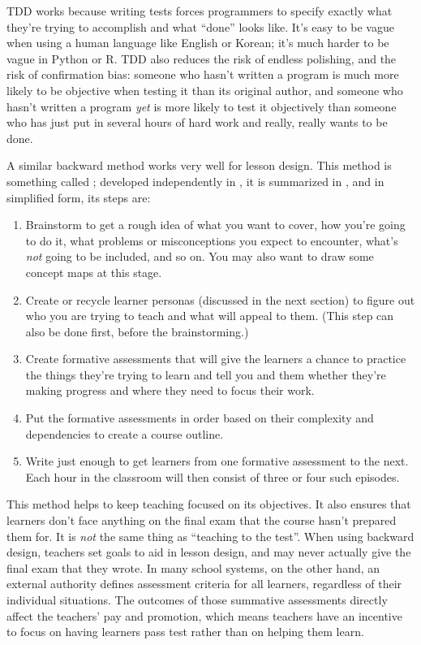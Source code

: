 TDD works because writing tests forces programmers to specify exactly
what they're trying to accomplish and what ``done'' looks like. It's
easy to be vague when using a human language like English or Korean;
it's much harder to be vague in Python or R.  TDD also reduces the
risk of endless polishing, and the risk of confirmation bias: someone
who hasn't written a program is much more likely to be objective when
testing it than its original author, and someone who hasn't written a
program \emph{yet} is more likely to test it objectively than someone
who has just put in several hours of hard work and really, really
wants to be done.

A similar backward method works very well for lesson design. This
method is something called ; developed independently in
\cite{Wigg2005,Bigg2011,Fink2013}, it is summarized in
\cite{McTi2013}, and in simplified form, its steps are:

\begin{enumerate}

\item
  Brainstorm to get a rough idea of what you want to cover, how you're
  going to do it, what problems or misconceptions you expect to
  encounter, what's \emph{not} going to be included, and so on. You
  may also want to draw some concept maps at this stage.

\item
  Create or recycle learner personas (discussed in the next section)
  to figure out who you are trying to teach and what will appeal to
  them.  (This step can also be done first, before the brainstorming.)

\item
  Create formative assessments that will give the learners a chance to
  practice the things they're trying to learn and tell you and them
  whether they're making progress and where they need to focus their
  work.

\item
  Put the formative assessments in order based on their complexity and
  dependencies to create a course outline.

\item
  Write just enough to get learners from one formative assessment to
  the next. Each hour in the classroom will then consist of three or
  four such episodes.

\end{enumerate}

This method helps to keep teaching focused on its objectives. It also
ensures that learners don't face anything on the final exam that the
course hasn't prepared them for.  It is \emph{not} the same thing as
``teaching to the test''. When using backward design, teachers set
goals to aid in lesson design, and may never actually give the final
exam that they wrote. In many school systems, on the other hand, an
external authority defines assessment criteria for all learners,
regardless of their individual situations.  The outcomes of those
summative assessments directly affect the teachers' pay and promotion,
which means teachers have an incentive to focus on having learners
pass test rather than on helping them learn.

